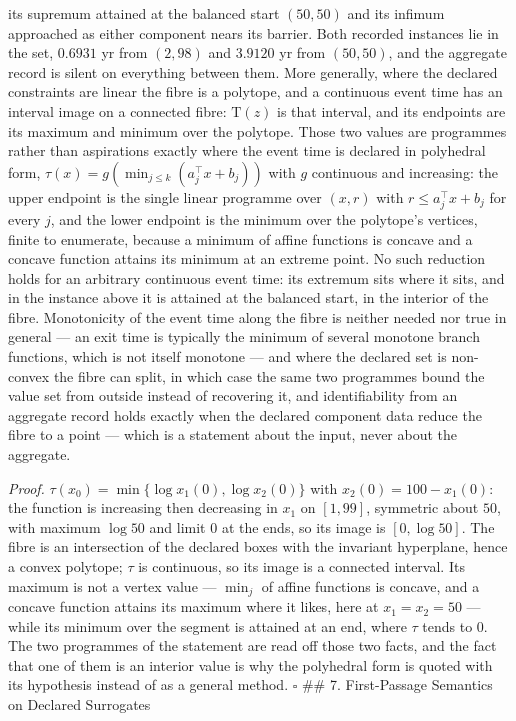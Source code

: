 \documentclass[11pt]{article}
\begin{document}
 its supremum attained at the balanced start \((50, 50)\) and its infimum approached as either component nears its barrier. Both recorded instances lie in the set, \(0.6931\) yr from \((2, 98)\) and \(3.9120\) yr from \((50, 50)\), and the aggregate record is silent on everything between them. More generally, where the declared constraints are linear the fibre is a polytope, and a continuous event time has an interval image on a connected fibre: \(\mathrm T(z)\) is that interval, and its endpoints are its maximum and minimum over the polytope. Those two values are programmes rather than aspirations exactly where the event time is declared in polyhedral form, \(\tau(x) =\allowbreak{} g(\min_{j \le k}(a_j^{\top} x +\allowbreak{} b_j))\) with \(g\) continuous and increasing: the upper endpoint is the single linear programme over \((x, r)\) with \(r \le a_j^{\top} x + b_j\) for every \(j\), and the lower endpoint is the minimum over the polytope's vertices, finite to enumerate, because a minimum of affine functions is concave and a concave function attains its minimum at an extreme point. No such reduction holds for an arbitrary continuous event time: its extremum sits where it sits, and in the instance above it is attained at the balanced start, in the interior of the fibre. Monotonicity of the event time along the fibre is neither needed nor true in general --- an exit time is typically the minimum of several monotone branch functions, which is not itself monotone --- and where the declared set is non-convex the fibre can split, in which case the same two programmes bound the value set from outside instead of recovering it, and identifiability from an aggregate record holds exactly when the declared component data reduce the fibre to a point --- which is a statement about the input, never about the aggregate.

\emph{Proof.} \(\tau(x_0) =\allowbreak{} \min\{\log x_1(0),\allowbreak{} \log x_2(0)\}\) with \(x_2(0) = 100 - x_1(0)\): the function is increasing then decreasing in \(x_1\) on \([1, 99]\), symmetric about \(50\), with maximum \(\log 50\) and limit \(0\) at the ends, so its image is \([0, \log 50]\). The fibre is an intersection of the declared boxes with the invariant hyperplane, hence a convex polytope; \(\tau\) is continuous, so its image is a connected interval. Its maximum is not a vertex value --- \(\min_j\) of affine functions is concave, and a concave function attains its maximum where it likes, here at \(x_1 = x_2 = 50\) --- while its minimum over the segment is attained at an end, where \(\tau\) tends to \(0\). The two programmes of the statement are read off those two facts, and the fact that one of them is an interior value is why the polyhedral form is quoted with its hypothesis instead of as a general method. \(\square\) \#\# 7. First-Passage Semantics on Declared Surrogates
\end{document}
